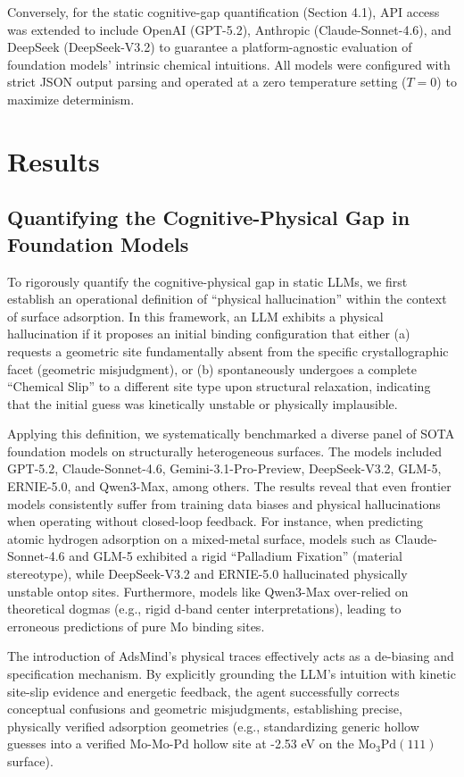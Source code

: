 \documentclass{article}
\begin{document}
Conversely, for the static cognitive-gap quantification (Section 4.1), API access was extended to include OpenAI (GPT-5.2), Anthropic (Claude-Sonnet-4.6), and DeepSeek (DeepSeek-V3.2) to guarantee a platform-agnostic evaluation of foundation models' intrinsic chemical intuitions. All models were configured with strict JSON output parsing and operated at a zero temperature setting ($T=0$) to maximize determinism.

\section{Results}
\subsection{Quantifying the Cognitive-Physical Gap in Foundation Models}

To rigorously quantify the cognitive-physical gap in static LLMs, we first establish an operational definition of ``physical hallucination'' within the context of surface adsorption. In this framework, an LLM exhibits a physical hallucination if it proposes an initial binding configuration that either (a) requests a geometric site fundamentally absent from the specific crystallographic facet (geometric misjudgment), or (b) spontaneously undergoes a complete ``Chemical Slip'' to a different site type upon structural relaxation, indicating that the initial guess was kinetically unstable or physically implausible.

Applying this definition, we systematically benchmarked a diverse panel of SOTA foundation models on structurally heterogeneous surfaces. The models included GPT-5.2, Claude-Sonnet-4.6, Gemini-3.1-Pro-Preview, DeepSeek-V3.2, GLM-5, ERNIE-5.0, and Qwen3-Max, among others. The results reveal that even frontier models consistently suffer from training data biases and physical hallucinations when operating without closed-loop feedback. For instance, when predicting atomic hydrogen adsorption on a mixed-metal surface, models such as Claude-Sonnet-4.6 and GLM-5 exhibited a rigid ``Palladium Fixation'' (material stereotype), while DeepSeek-V3.2 and ERNIE-5.0 hallucinated physically unstable ontop sites. Furthermore, models like Qwen3-Max over-relied on theoretical dogmas (e.g., rigid d-band center interpretations), leading to erroneous predictions of pure Mo binding sites.

The introduction of AdsMind's physical traces effectively acts as a de-biasing and specification mechanism. By explicitly grounding the LLM's intuition with kinetic site-slip evidence and energetic feedback, the agent successfully corrects conceptual confusions and geometric misjudgments, establishing precise, physically verified adsorption geometries (e.g., standardizing generic hollow guesses into a verified Mo-Mo-Pd hollow site at -2.53 eV on the $\text{Mo}_{3}\text{Pd}(111)$ surface).
\end{document}
